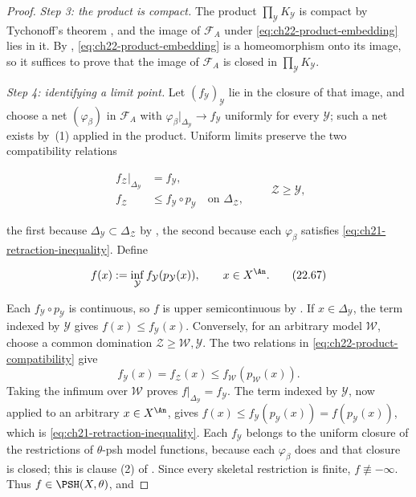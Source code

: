 \begin{proof}
\emph{Step 3: the product is compact.}  The product
$\prod_{\mathcal Y}K_{\mathcal Y}$ is compact by Tychonoff's theorem
\cite[Chapter~5]{Kel75}, and the image of $\mathcal F_A$ under
\eqref{eq:ch22-product-embedding} lies in it.  By
, \eqref{eq:ch22-product-embedding} is a
homeomorphism onto its image, so it suffices to prove that the image of
$\mathcal F_A$ is closed in $\prod_{\mathcal Y}K_{\mathcal Y}$.

\emph{Step 4: identifying a limit point.}  Let
$(f_{\mathcal Y})_{\mathcal Y}$ lie in the closure of that image, and
choose a net $(\varphi_\beta)$ in $\mathcal F_A$ with
$\varphi_\beta|_{\Delta_{\mathcal Y}}\to f_{\mathcal Y}$ uniformly for
every $\mathcal Y$; such a net exists by
\,(1) applied in the product.  Uniform limits
preserve the two compatibility relations

\[
 \begin{aligned}
 f_{\mathcal Z}|_{\Delta_{\mathcal Y}}&=f_{\mathcal Y},\\
 f_{\mathcal Z}&\leq f_{\mathcal Y}\circ p_{\mathcal Y}
                    \quad\text{on }\Delta_{\mathcal Z},
 \end{aligned}
 \qquad \mathcal Z\geq\mathcal Y,
\tag{22.66}\label{eq:ch22-product-compatibility}
\]

the first because $\Delta_{\mathcal Y}\subset\Delta_{\mathcal Z}$ by
, the second because each $\varphi_\beta$
satisfies \eqref{eq:ch21-retraction-inequality}.  Define

\[
           f(x):=\inf_{\mathcal Y}
                  f_{\mathcal Y}(p_{\mathcal Y}(x)),
           \qquad x\in X^{\An}.
\tag{22.67}\label{eq:ch22-product-limit-function}
\]

Each $f_{\mathcal Y}\circ p_{\mathcal Y}$ is continuous, so $f$ is upper
semicontinuous by .  If
$x\in\Delta_{\mathcal Y}$, the term indexed by $\mathcal Y$ gives
$f(x)\leq f_{\mathcal Y}(x)$.  Conversely, for an arbitrary model
$\mathcal W$, choose a common domination
$\mathcal Z\geq\mathcal W,\mathcal Y$.  The two relations in
\eqref{eq:ch22-product-compatibility} give
\[
 f_{\mathcal Y}(x)=f_{\mathcal Z}(x)
 \leq f_{\mathcal W}(p_{\mathcal W}(x)).
\]
Taking the infimum over $\mathcal W$ proves
$f|_{\Delta_{\mathcal Y}}=f_{\mathcal Y}$.  The term indexed by
$\mathcal Y$, now applied to an arbitrary $x\in X^{\An}$, gives
$f(x)\leq f_{\mathcal Y}(p_{\mathcal Y}(x))=f(p_{\mathcal Y}(x))$, which is
\eqref{eq:ch21-retraction-inequality}.  Each $f_{\mathcal Y}$ belongs to
the uniform closure of the restrictions of $\theta$-psh model functions,
because each $\varphi_\beta$ does and that closure is closed; this is
clause (2) of .  Since every skeletal restriction is
finite, $f\not\equiv-\infty$.  Thus $f\in\PSH(X,\theta)$, and


\end{proof}
